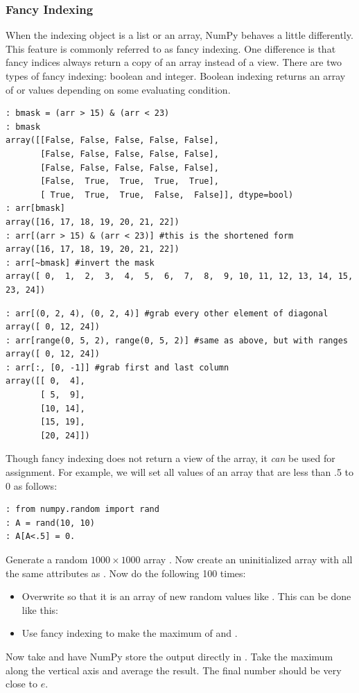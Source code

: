 \subsubsection*{Fancy Indexing}
When the indexing object is a list or an array, NumPy behaves a little differently.
This feature is commonly referred to as fancy indexing.
One difference is that fancy indices always return a copy of an array instead of a view.
There are two types of fancy indexing: boolean and integer.
Boolean indexing returns an array of  or  values depending on some evaluating condition.
\begin{lstlisting}
: bmask = (arr > 15) & (arr < 23)
: bmask
array([[False, False, False, False, False],
       [False, False, False, False, False],
       [False, False, False, False, False],
       [False,  True,  True,  True,  True],
       [ True,  True,  True,  False,  False]], dtype=bool)
: arr[bmask]
array([16, 17, 18, 19, 20, 21, 22])
: arr[(arr > 15) & (arr < 23)] #this is the shortened form
array([16, 17, 18, 19, 20, 21, 22])
: arr[~bmask] #invert the mask
array([ 0,  1,  2,  3,  4,  5,  6,  7,  8,  9, 10, 11, 12, 13, 14, 15, 23, 24])
\end{lstlisting}
\begin{lstlisting}
: arr[(0, 2, 4), (0, 2, 4)] #grab every other element of diagonal
array([ 0, 12, 24])
: arr[range(0, 5, 2), range(0, 5, 2)] #same as above, but with ranges
array([ 0, 12, 24])
: arr[:, [0, -1]] #grab first and last column
array([[ 0,  4],
       [ 5,  9],
       [10, 14],
       [15, 19],
       [20, 24]])
\end{lstlisting}

Though fancy indexing does not return a view of the array, it \emph{can} be used for assignment.
For example, we will set all values of an array that are less than .5 to 0 as follows:
\begin{lstlisting}
: from numpy.random import rand
: A = rand(10, 10)
: A[A<.5] = 0.
\end{lstlisting}

\begin{problem}
Generate a random $1000 \times 1000$ array .
Now create an uninitialized array  with all the same attributes as .
Now do the following 100 times:
\begin{itemize}
\item Overwrite  so that it is an array of new random values like .
This can be done like this: 
\item Use fancy indexing to make  the maximum of  and .
\end{itemize}
Now take  and have NumPy store the output directly in .
Take the maximum along the vertical axis and average the result.
The final number should be very close to $e$.
\end{problem}

